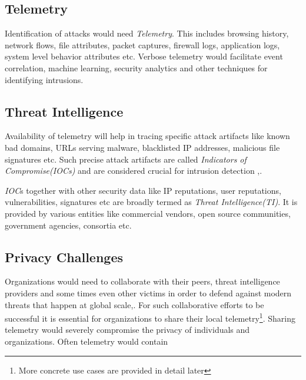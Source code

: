 \documentclass[runningheads,a4paper]{llncs}
\begin{document}
\subsection{Telemetry}

Identification of attacks would need \emph{Telemetry}. This includes browsing history, network flows, file attributes, packet captures, firewall logs, application logs, system level behavior attributes etc. Verbose telemetry would facilitate event correlation, machine learning, security analytics and other techniques for identifying intrusions. 

\subsection{Threat Intelligence}
Availability of telemetry will help in tracing specific attack artifacts like known bad domains, URLs serving malware, blacklisted  IP addresses, malicious file signatures etc. Such precise attack artifacts are called \emph{Indicators of Compromise(IOCs)} and are considered crucial for intrusion detection \cite{ioc21ct},\cite{iocsans}. 

  \emph{IOC}s together with other security data like IP reputations, user reputations, vulnerabilities, signatures etc are broadly termed as \emph{Threat Intelligence(TI)}\cite{ti}. It is provided by various entities like commercial vendors, open source communities, government agencies, consortia etc.\cite{tx}
  
\begin{comment}
Simplistic definition is 
\begin{quote}
\emph{Threat Intelligence(TI)} is security data that provides the ability to
prepare to detect, prevent, or investigate emerging attacks
before your organization is attacked\cite{ti}.
\end{quote}  
\end{comment}


\subsection{Privacy Challenges}
Organizations would need to collaborate with their peers, threat intelligence providers and some times even other victims in order to defend against modern threats that happen at global scale\cite{gilbert2014scalable},\cite{zetter2010google}. For such collaborative efforts to be successful it is essential for organizations to share their local telemetry\footnote{ More concrete use cases are provided in detail later}. Sharing telemetry would severely compromise the privacy of individuals and organizations. Often telemetry would contain 
\end{document}
